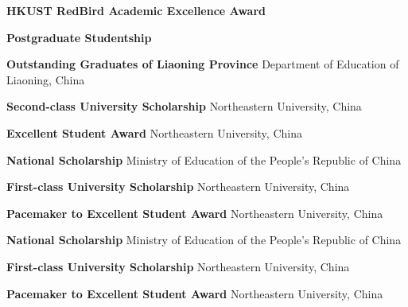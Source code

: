 %
%
%


\begin{scholarship}
	{\textbf{HKUST RedBird Academic Excellence Award}}

	{\textbf{Postgraduate Studentship}}

	{\textbf{Outstanding Graduates of Liaoning Province}}
	\scholarshipentry{}
	{Department of Education of Liaoning, China}

	{\textbf{Second-class University Scholarship}}
	\scholarshipentry{}
	{Northeastern University, China}

	{\textbf{Excellent Student Award}}
	\scholarshipentry{}
	{Northeastern University, China}

	{\textbf{National Scholarship}}
	\scholarshipentry{}
	{Ministry of Education of the People's Republic of China}

	{\textbf{First-class University Scholarship}}
	\scholarshipentry{}
	{Northeastern University, China}

	{\textbf{Pacemaker to Excellent Student Award}}
	\scholarshipentry{}
	{Northeastern University, China}

	{\textbf{National Scholarship}}
	\scholarshipentry{}
	{Ministry of Education of the People's Republic of China}

	{\textbf{First-class University Scholarship}}
	\scholarshipentry{}
	{Northeastern University, China}

	{\textbf{Pacemaker to Excellent Student Award}}
	\scholarshipentry{}
	{Northeastern University, China}
\end{scholarship}
